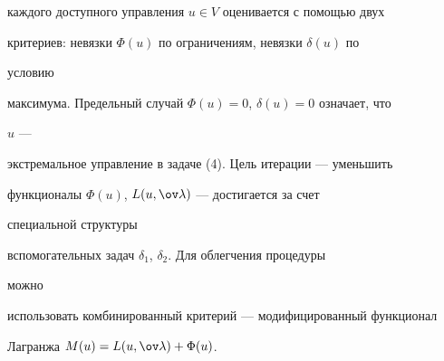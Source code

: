 каждого доступного управления $u\in V$ оценивается с помощью двух 


критериев: невязки $\Phi(u)$ по ограничениям, невязки $\delta(u)$ по 


условию 


максимума. Предельный случай $\Phi(u)=0$, $\delta(u)=0$ означает, что 


$u$ --- 


экстремальное управление в задаче (4). Цель итерации --- уменьшить 


функционалы $\Phi(u)$, $L(u,\ov\lambda)$ --- достигается за счет 


специальной структуры 


вспомогательных задач $\delta_1$, $\delta_2$. Для облегчения процедуры 


можно 


использовать комбинированный критерий --- модифицированный функционал 


Лагранжа $M(u)=L(u,\ov\lambda)+\Phi(u)$. 


 


